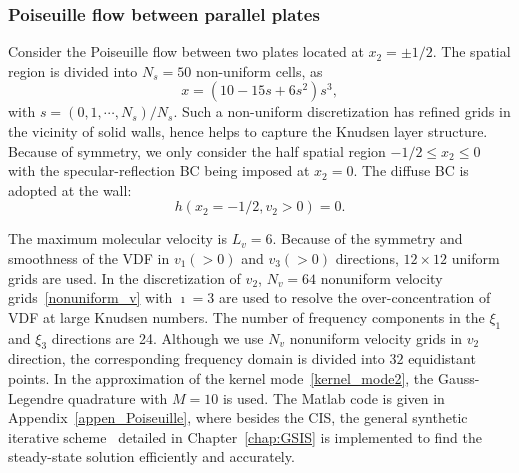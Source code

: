 \subsubsection{Poiseuille flow between parallel plates}

Consider the Poiseuille flow between two plates located at $x_2=\pm1/2$. The spatial region is divided into $N_s=50$ non-uniform cells, as
\begin{equation}\label{spatial_d}
x=(10-15s+6s^2)s^3, 
\end{equation}
with $s=(0,1,\cdots,N_s)/N_s$. Such a non-uniform discretization has refined grids in the vicinity of solid walls, hence helps to capture the Knudsen layer structure.
Because of symmetry, we only consider the half spatial region $-1/2\le{}x_2\le0$ with the specular-reflection BC being imposed at $x_2=0$. The diffuse BC is adopted at the wall: 
\begin{equation}
h\left(x_2=-{1}/{2},v_2>0\right)=0.
\end{equation}

The maximum molecular velocity is $L_v=6$. Because of the symmetry and smoothness of the VDF in $v_1(>0)$ and $v_3(>0)$ directions, $12\times12$ uniform grids are used. In the discretization of $v_2$, $N_v=64$ nonuniform velocity grids~\eqref{nonuniform_v} with $\imath=3$ are used to resolve the over-concentration of VDF at large Knudsen numbers. 
The number of frequency components in the $\xi_1$ and $\xi_3$ directions are 24. Although we use $N_v$ nonuniform velocity grids in $v_2$ direction, the corresponding frequency domain is divided into $32$ equidistant points. In the approximation of the kernel mode~\eqref{kernel_mode2}, the Gauss-Legendre quadrature with $M=10$ is used. The Matlab code is given in Appendix~\ref{appen_Poiseuille}, where besides the CIS, the general synthetic iterative scheme~\cite{LeiJCP2017,SuArXiv2019} detailed in Chapter~\ref{chap:GSIS} is implemented to find the steady-state solution efficiently and accurately. 



